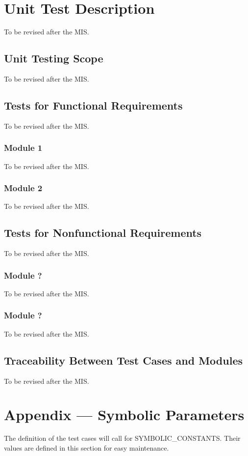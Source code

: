 \documentclass[12pt, titlepage]{article}
\begin{document}
\section{Unit Test Description}
To be revised after the MIS.
\subsection{Unit Testing Scope}
To be revised after the MIS.
\subsection{Tests for Functional Requirements}
To be revised after the MIS.
\subsubsection{Module 1}
To be revised after the MIS.
\subsubsection{Module 2}
To be revised after the MIS.
\subsection{Tests for Nonfunctional Requirements}
To be revised after the MIS.
\subsubsection{Module ?}
To be revised after the MIS.
\subsubsection{Module ?}
To be revised after the MIS.
\subsection{Traceability Between Test Cases and Modules}
To be revised after the MIS.




\newpage


\section*{Appendix --- Symbolic Parameters}
The definition of the test cases will call for SYMBOLIC\_CONSTANTS.
Their values are defined in this section for easy maintenance.\\\\
\end{document}
